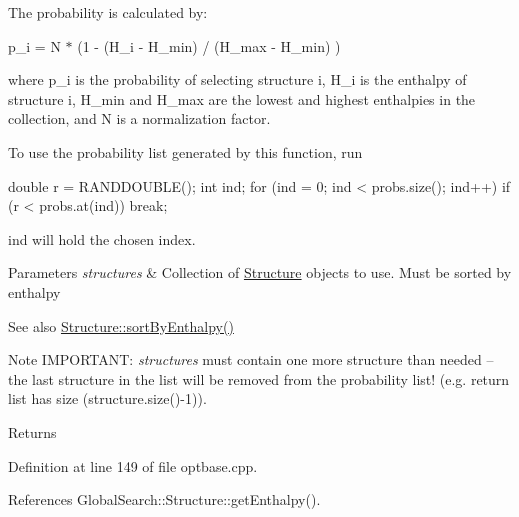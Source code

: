 The probability is calculated by\+:

p\+\_\+i = N $\ast$ (1 -\/ (H\+\_\+i -\/ H\+\_\+min) / (H\+\_\+max -\/ H\+\_\+min) )

where p\+\_\+i is the probability of selecting structure i, H\+\_\+i is the enthalpy of structure i, H\+\_\+min and H\+\_\+max are the lowest and highest enthalpies in the collection, and N is a normalization factor.

To use the probability list generated by this function, run 
\begin{DoxyCode}
\textcolor{keywordtype}{double} r = RANDDOUBLE();
\textcolor{keywordtype}{int} ind;
\textcolor{keywordflow}{for} (ind = 0; ind < probs.size(); ind++)
  \textcolor{keywordflow}{if} (r < probs.at(ind)) \textcolor{keywordflow}{break};
\end{DoxyCode}
 ind will hold the chosen index.


\begin{DoxyParams}{Parameters}
{\em structures} & Collection of \hyperlink{classGlobalSearch_1_1Structure}{Structure} objects to use. Must be sorted by enthalpy\\
\hline
\end{DoxyParams}
\begin{DoxySeeAlso}{See also}
\hyperlink{classGlobalSearch_1_1Structure_a58d72124caf9401902f6a7653e0e7646}{Structure\+::sort\+By\+Enthalpy()}
\end{DoxySeeAlso}
\begin{DoxyNote}{Note}
I\+M\+P\+O\+R\+T\+A\+N\+T\+: {\itshape structures} must contain one more structure than needed -- the last structure in the list will be removed from the probability list! (e.\+g. return list has size (structure.\+size()-\/1)).
\end{DoxyNote}
\begin{DoxyReturn}{Returns}

\end{DoxyReturn}


Definition at line 149 of file optbase.\+cpp.



References Global\+Search\+::\+Structure\+::get\+Enthalpy().

\hypertarget{classGlobalSearch_1_1OptBase_a79650b4bd0dde4580a98a89e7032be96}{}
